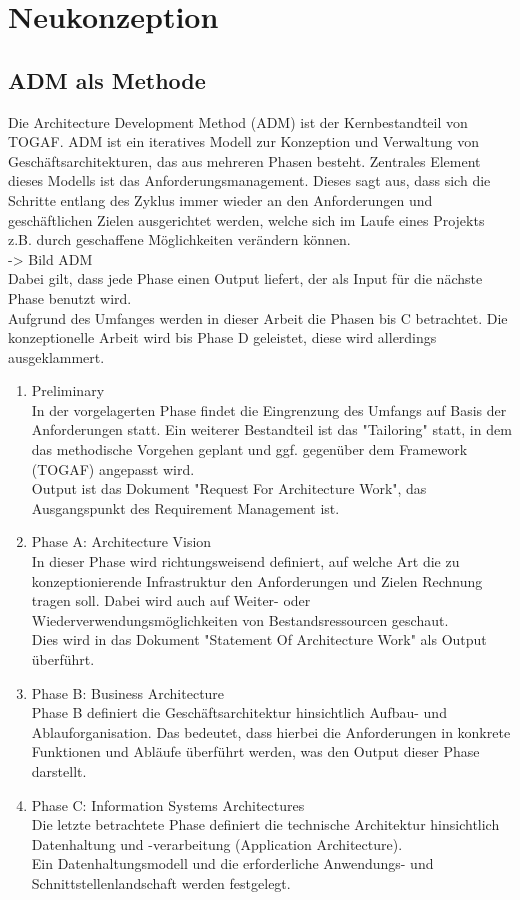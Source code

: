 \chapter{Neukonzeption}

\section{ADM als Methode}
Die Architecture Development Method (ADM) ist der Kernbestandteil von TOGAF. 
ADM ist ein iteratives Modell zur Konzeption und Verwaltung von Geschäftsarchitekturen, das aus mehreren Phasen besteht.
Zentrales Element dieses Modells ist das Anforderungsmanagement.
Dieses sagt aus, dass sich die Schritte entlang des Zyklus immer wieder an den Anforderungen und geschäftlichen Zielen ausgerichtet werden, welche sich im Laufe eines Projekts z.B. durch geschaffene Möglichkeiten verändern können.\\
-> Bild ADM
\\
Dabei gilt, dass jede Phase einen Output liefert, der als Input für die nächste Phase benutzt wird.\\
Aufgrund des Umfanges werden in dieser Arbeit die Phasen bis C betrachtet. Die konzeptionelle Arbeit wird bis Phase D geleistet, diese wird allerdings ausgeklammert.
\begin{enumerate}
\item{Preliminary}
\\ In der vorgelagerten Phase findet die Eingrenzung des Umfangs auf Basis der Anforderungen statt. 
Ein weiterer Bestandteil ist das "Tailoring" statt, in dem das methodische Vorgehen geplant und ggf. gegenüber dem Framework (TOGAF) angepasst wird.\\
Output ist das Dokument "Request For Architecture Work", das Ausgangspunkt des Requirement Management ist.
\item{Phase A: Architecture Vision}
\\ In dieser Phase wird richtungsweisend definiert, auf welche Art die zu konzeptionierende Infrastruktur den Anforderungen und Zielen Rechnung tragen soll. Dabei wird auch auf Weiter- oder Wiederverwendungsmöglichkeiten von Bestandsressourcen geschaut.\\
Dies wird in das Dokument "Statement Of Architecture Work" als Output überführt.
\item{Phase B: Business Architecture}
\\ Phase B definiert die Geschäftsarchitektur hinsichtlich Aufbau- und Ablauforganisation. Das bedeutet, dass hierbei die Anforderungen in konkrete Funktionen und Abläufe überführt werden, was den Output dieser Phase darstellt.
\item{Phase C: Information Systems Architectures}
\\ Die letzte betrachtete Phase definiert die technische Architektur hinsichtlich Datenhaltung und -verarbeitung (Application Architecture). \\
Ein Datenhaltungsmodell und die erforderliche Anwendungs- und Schnittstellenlandschaft werden festgelegt.


\end{enumerate}




